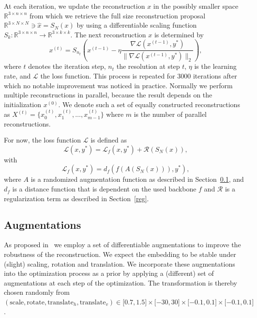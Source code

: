 \documentclass[10pt,twocolumn]{article}
\begin{document}
At each iteration, we update the reconstruction $x$ in the possibly smaller space $\mathbb{R}^{3\times n \times n}$ from which we retrieve the full size reconstruction proposal $\mathbb{R}^{3\times N \times N}\ni\hat{x} = S_N(x)$ by using a differentiable scaling function $S_k:\mathbb{R}^{3\times n \times n}\rightarrow\mathbb{R}^{3\times k \times k}$.
The next reconstruction $x$ is determined by
\begin{equation}\label{eq:update_rule}
x^{(t)} = S_{n_t}\left(x^{(t-1)} - \eta \dfrac{\nabla \mathcal{L}(x^{(t-1)}, y^*)}{\|\nabla \mathcal{L}(x^{(t-1)}, y^*)\|_2}\right),
\end{equation}
where $t$ denotes the iteration step, $n_t$ the resolution at step $t$, $\eta$ is the learning rate, and $\mathcal{L}$ the loss function.
This process is repeated for 3000 iterations after which no notable improvement was noticed in practice.
Normally we perform multiple reconstructions in parallel, because the result depends on the initialization $x^{(0)}$.
We denote such a set of equally constructed reconstructions as $X^{(t)} = \{x^{(t)}_0, x^{(t)}_1, \dots, x^{(t)}_{m-1}\}$ where $m$ is the number of parallel reconstructions.

For now, the loss function $\mathcal{L}$ is defined as
\begin{equation}\label{eq:loss_function_base}
\mathcal{L}(x, y^*) = \mathcal{L}_{f}(x, y^*) + \mathcal{R}(S_N(x)),
\end{equation}
with
\begin{equation}\label{eq:loss_function_f}
    \mathcal{L}_f(x, y^*) = d_{f}(f(A(S_N(x))), y^*),
\end{equation}
where $A$ is a randomized augmentation function as described in Section~\ref{augs}, and $d_f$ is a distance function that is dependent on the used backbone $f$ and $\mathcal{R}$ is a regularization term as described in Section~\ref{reg}.

\subsection{Augmentations}\label{augs}
As proposed in~\cite{ghiasiPlugInInversionModelAgnostic2021} we employ a set of differentiable augmentations to improve the robustness of the reconstruction.
We expect the embedding to be stable under (slight) scaling, rotation and translation.
We incorporate these augmentations into the optimization process as a prior by applying a (different) set of augmentations at each step of the optimization.
The transformation is thereby chosen randomly from $(\text{scale}, \text{rotate}, \text{translate}_h, \text{translate}_v) \in \lbrack 0.7, 1.5\rbrack\times \lbrack -30, 30\rbrack \times \lbrack -0.1, 0.1\rbrack \times \lbrack -0.1, 0.1\rbrack$.
\end{document}
